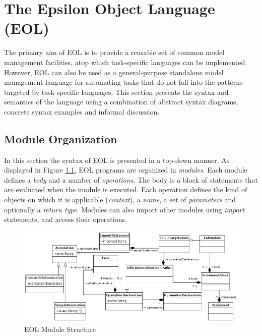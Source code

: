 \chapter{The Epsilon Object Language (EOL)}
\label{sec:Design.EOL}

The primary aim of EOL is to provide a reusable set of common model management facilities, atop which task-specific languages can be implemented. However, EOL can also be used as a general-purpose standalone model management language for automating tasks that do not fall into the patterns targeted by task-specific languages. This section presents the syntax and semantics of the language using a combination of abstract syntax diagrams, concrete syntax examples and informal discussion.

\section{Module Organization}
\label{sec:Design.EOL.Syntax}
In this section the syntax of EOL is presented in a top-down manner. As displayed in Figure \ref{fig:EOL.Module}, EOL programs are organized in \emph{modules}. Each module defines a \emph{body} and a number of \emph{operations}. The body is a block of statements that are evaluated when the module is executed. Each operation defines the kind of objects on which it is applicable (\emph{context}), a \emph{name}, a set of \emph{parameters} and optionally a \emph{return type}. Modules can also import other modules using \emph{import} statements, and access their operations.

\label{sec:Design.EOL.ModuleStucture}
\begin{landscape}
\begin{figure}
	\centering
		\includegraphics{images/EOLModule.png}
	\caption{EOL Module Structure}
	\label{fig:EOL.Module}
\end{figure}
\end{landscape}

